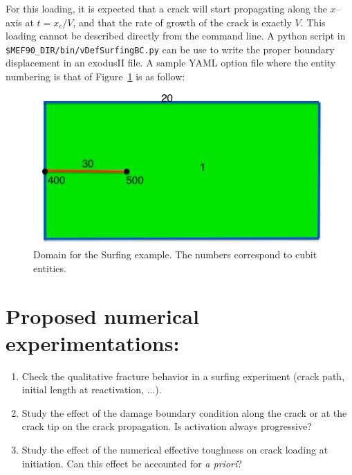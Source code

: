 \documentclass[10pt,oneside]{memoir}
\begin{document}
For this loading, it is expected that a crack will start propagating along the $x$--axis at $t=x_c/V$, and that the rate of growth of the crack is exactly $V$.
This loading cannot be described directly from the command line. A python script in \verb+$MEF90_DIR/bin/vDefSurfingBC.py+ can be use to write the proper boundary displacement in an exodusII file. 
A sample YAML option file where the entity numbering is that of Figure~\ref{fig:Surfing} is as follow:
%

\begin{figure}[H]
\centering
\includegraphics[width=.45\textwidth]{Examples/Surfing/Geometry.png}
\caption{Domain for the Surfing example. The numbers correspond to cubit entities.}
\label{fig:Surfing}
\end{figure}



\section*{Proposed numerical experimentations:}
\begin{enumerate}
\item Check the qualitative fracture behavior in a surfing experiment (crack path, initial length at reactivation, ...).
\item Study the effect of the damage boundary condition along the crack or at the crack tip on the crack propagation. Is activation always progressive?
\item Study the effect of the numerical effective toughness on crack loading at initiation. Can this effect be accounted for \emph{a priori}?
\end{enumerate}
\end{document}
